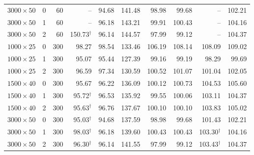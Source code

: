 \begin{table}[h]
\begin{tabular}{lrrrrrrrrr}
$3000\times50$ & 0 & 60 & -- & 94.68 & 141.48 & 98.98 & 99.68 & -- & 102.21\\
$3000\times50$ & 1 & 60 & -- & 96.18 & 143.21 & 99.91 & 100.43 & -- & 104.16\\
$3000\times50$ & 2 & 60 & 150.73$^\dagger$ & 96.14 & 144.57 & 97.99 & 99.12 & -- & 104.37\\
$1000\times25$ & 0 & 300 & 98.27 & 98.54 & 133.46 & 106.19 & 108.14 & 108.09 & 109.02\\
$1000\times25$ & 1 & 300 & 95.07 & 95.44 & 127.39 & 99.16 & 99.19 & 98.29 & 99.69\\
$1000\times25$ & 2 & 300 & 96.59 & 97.34 & 130.59 & 100.52 & 101.07 & 101.04 & 102.05\\
$1500\times40$ & 0 & 300 & 95.67 & 96.22 & 136.09 & 100.12 & 100.73 & 104.53 & 105.60\\
$1500\times40$ & 1 & 300 & 95.72$^\dagger$ & 96.53 & 135.92 & 99.55 & 100.06 & 103.11 & 104.37\\
$1500\times40$ & 2 & 300 & 95.63$^\dagger$ & 96.76 & 137.67 & 100.10 & 100.10 & 103.83 & 105.02\\
$3000\times50$ & 0 & 300 & 95.03$^\dagger$ & 94.68 & 137.59 & 98.98 & 99.68 & 101.43 & 102.21\\
$3000\times50$ & 1 & 300 & 98.03$^\dagger$ & 96.18 & 139.60 & 100.43 & 100.43 & 103.30$^\dagger$ & 104.16\\
$3000\times50$ & 2 & 300 & 96.30$^\dagger$ & 96.14 & 141.55 & 97.99 & 99.12 & 103.43$^\dagger$ & 104.37\\
\bottomrule
\end{tabular}
\end{table}
